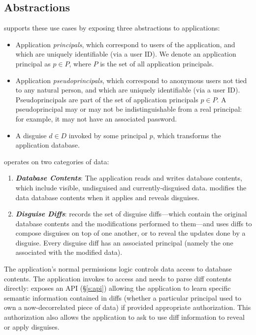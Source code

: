 \subsection{\sys Abstractions}
\sys supports these use cases by exposing three abstractions to applications:
\begin{itemize}
    \item Application \emph{principals}, which correspond to users of the application, 
	and which are uniquely identifiable (\eg via a user ID).
	We denote an application principal as $p \in P$, where $P$ is the set of all application principals.
    \item Application \emph{pseudoprincipals}, which correspond to anonymous users not tied to any natural
    person, and which are uniquely identifiable (\eg via a user ID).
	Pseudoprincipals are part of the set of application principals $p \in P$.
    A pseudoprincipal may or may not be indistinguishable from a real principal: for example, it 
        may not have an associated password.
    \item A disguise $d \in D$ invoked by some principal $p$, which 
        transforms the application database.
\end{itemize}
%
%
\sys operates on two categories of data:
\begin{enumerate}
    \item \emph{\textbf{Database Contents}}: The application reads and writes database
        contents, which include visible, undisguised and currently-disguised data.
        \sys modifies the data database contents when it applies and reveals disguises.
    \item \emph{\textbf{Disguise Diffs}}: \sys records the set of disguise diffs---which contain the
        original database contents and the modifications performed to them---and uses diffs to
        compose disguises on top of one another, or to reveal the updates done by a disguise.
        Every disguise diff has an associated principal (namely the one associated with the modified data).
\end{enumerate}

The application's normal permissions logic controls data access to database contents. The
application invokes \sys to access and needs to parse diff contents directly: \sys exposes an API
(\S\ref{s:api}) allowing the application to learn specific semantic information contained in diffs
(\eg whether a particular principal used to own a now-decorrelated piece of data) if provided
appropriate authorization. This authorization also allows the application to ask \sys to use diff
information to reveal or apply disguises.


